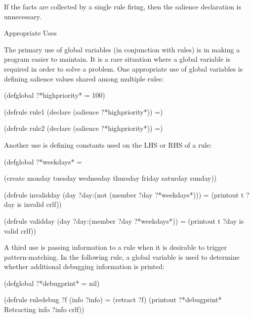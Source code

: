 \documentclass[letterpaper,10pt,english]{sphinxmanual}
\begin{document}
If the  facts are collected by a single rule firing, then the
salience declaration is unnecessary.

Appropriate Uses

The primary use of global variables (in conjunction with rules) is in
making a program easier to maintain. It is a rare situation where a
global variable is required in order to solve a problem. One appropriate
use of global variables is defining salience values shared among
multiple rules:

\begin{sphinxVerbatim}[commandchars=\\\{\}]
(defglobal ?*high\PYGZhy{}priority* = 100)

(defrule rule\PYGZhy{}1
  (declare (salience ?*high\PYGZhy{}priority*))
  =\PYGZgt{})

(defrule rule\PYGZhy{}2
  (declare (salience ?*high\PYGZhy{}priority*))
  =\PYGZgt{})
\end{sphinxVerbatim}

Another use is defining constants used on the LHS or RHS of a rule:

\begin{sphinxVerbatim}[commandchars=\\\{\}]
(defglobal ?*week\PYGZhy{}days* =

(create\PYGZdl{} monday tuesday wednesday thursday friday saturday sunday))

(defrule invalid\PYGZhy{}day
  (day ?day\PYGZam{}:(not (member\PYGZdl{} ?day ?*week\PYGZhy{}days*)))
  =\PYGZgt{}
 (printout t ?day \PYGZdq{} is invalid\PYGZdq{} crlf))

(defrule valid\PYGZhy{}day
  (day ?day\PYGZam{}:(member\PYGZdl{} ?day ?*week\PYGZhy{}days*))
  =\PYGZgt{}
  (printout t ?day \PYGZdq{} is valid\PYGZdq{} crlf))
\end{sphinxVerbatim}

A third use is passing information to a rule when it is desirable 
to trigger pattern-matching. In the following rule, a global variable is
used to determine whether additional debugging information is printed:

\begin{sphinxVerbatim}[commandchars=\\\{\}]
(defglobal ?*debug\PYGZhy{}print* = nil)

(defrule rule\PYGZhy{}debug
  ?f \PYGZlt{}\PYGZhy{} (info ?info)
  =\PYGZgt{}
  (retract ?f)
  (printout ?*debug\PYGZhy{}print* \PYGZdq{}Retracting info \PYGZdq{} ?info crlf))
\end{sphinxVerbatim}
\end{document}
